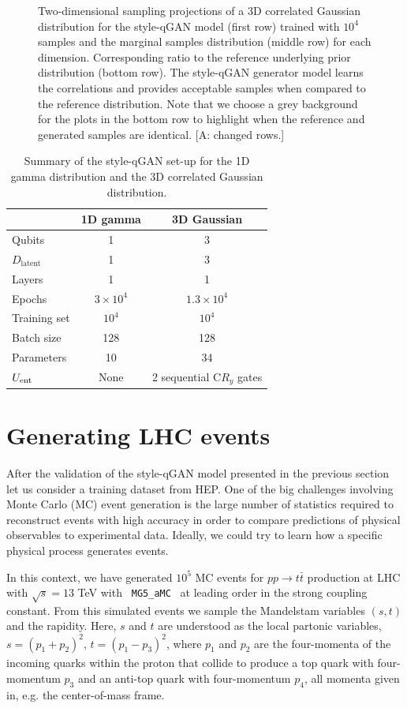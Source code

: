 \documentclass[twocolumn,preprintnumbers,superscriptaddress]{revtex4-2}
\newcommand{\commentAF}[1]{{\color{cyan} {[A: #1]}}}
\begin{document}
\begin{figure}
  \caption{\label{fig:3dgauss}Two-dimensional sampling projections of a 3D
  correlated Gaussian distribution for the style-qGAN model (first row) trained
  with $10^4$ samples and the marginal samples distribution (middle row)
  for each dimension. Corresponding ratio to the reference underlying
  prior distribution (bottom row).  The style-qGAN generator model learns the correlations and
  provides acceptable samples when compared to the reference distribution. Note that we choose a grey background for the plots in the bottom row to highlight when the reference and generated samples are identical.\commentAF{changed rows.}}
\end{figure}

\begin{table}
  \begin{tabular}{l|c|c}
     & {\bf 1D gamma} & {\bf 3D Gaussian} \tabularnewline
    \hline
    Qubits & 1 & 3 \tabularnewline
    $D_{\mathrm{latent}}$ & 1 & 3 \tabularnewline
    Layers & 1 & 1 \tabularnewline
    Epochs & $3\times10^4$ & $1.3\times10^4$ \tabularnewline
    Training set & $10^4$ & $10^4$ \tabularnewline
    Batch size & 128 & 128 \tabularnewline
    Parameters & 10 & 34 \tabularnewline
    $U_{\rm ent}$ & None & 2 sequential C$R_y$ gates \tabularnewline
    \hline
  \end{tabular}

  \caption{\label{table:summary} Summary of the style-qGAN set-up for the 1D
  gamma distribution and the 3D correlated Gaussian distribution.}
\end{table}


\section{Generating LHC events}
\label{sec:lhc}

After the validation of the style-qGAN model presented in the previous section
let us consider a training dataset from HEP. One of the big challenges involving
Monte Carlo (MC) event generation is the large number of statistics required to
reconstruct events with high accuracy in order to compare predictions of
physical observables to experimental data. Ideally, we could try
to learn how a specific physical process generates events.

In this context, we have generated $10^5$ MC events for $pp\rightarrow t\bar{t}$
production at LHC with $\sqrt{s} = 13$ TeV with {\tt
MG5\_aMC}~\cite{Alwall:2014hca,Frederix:2018nkq} at leading order in the strong coupling constant. From this simulated events we
sample the Mandelstam variables $(s,t)$ and the rapidity. Here, $s$
and $t$ are understood as the local partonic variables,
$s=(p_1^{}+p_2^{})^2$, $t=(p_1^{}-p_3^{})_{}^2$, where $p_1^{}$ and
$p_2^{}$ are the four-momenta of the incoming quarks within the proton that collide to produce a top quark with four-momentum $p_3^{}$ and an anti-top quark with four-momentum $p_4^{}$, all momenta given in, e.g. the center-of-mass frame.
\end{document}
